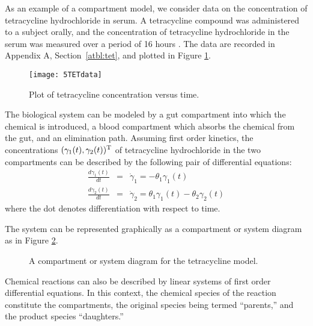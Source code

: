 \begin{example}\label{tet:1}
  
As an example of a compartment model, we consider data on the
concentration of tetracycline hydrochloride in serum.  A
tetracycline compound was administered to a subject orally, and the
concentration of tetracycline hydrochloride in the serum was
measured over a period of 16 hours \cite{wagn:1967}.
The data are recorded in Appendix A, Section~\ref{atbl:tet},
and plotted in Figure \ref{fig:TETdata}.
\begin{figure}[tbp]
  \centerline{\texttt{[image: 5TETdata]}}%
  \caption{\label{fig:TETdata}
  Plot of tetracycline concentration versus time.}
\end{figure}


The biological system can be modeled by a gut compartment into
which the chemical is introduced, a blood compartment which
absorbs the chemical from the gut, and an elimination path.
Assuming first order kinetics, the concentrations
$( \gamma_1 (t) , \gamma_2 (t) ) \trans$
of tetracycline hydrochloride in the two compartments
can be described by the following pair of differential equations:
\begin{eqnarray} \label{eqn:5.1}
  \frac{d\gamma_1(t)}{d t}&=&
  \dot \gamma_1 = - \theta_1 \gamma_1 ( t )\\
  \frac{d\gamma_2(t)}{d t}&=&
  \dot \gamma_2 =
  \theta_1 \gamma_1 ( t ) - \theta_2 \gamma_2 ( t )\nonumber
\end{eqnarray}
where the dot denotes differentiation with
respect to time.

The system can be represented graphically as a compartment or system
diagram as in Figure \ref{fig:tet}.

\begin{figure}
  \centerline{\box\graph}
  \caption{\label{fig:tet}
  A compartment or system diagram for the tetracycline model.}
\end{figure}
\end{example}

Chemical reactions can also be described by linear systems of first
order differential equations.
In this context, the chemical species
of the reaction constitute the compartments, the original species
being termed ``parents,''
and the product species ``daughters.''

